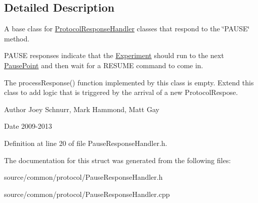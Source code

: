 \subsection{Detailed Description}
A base class for \hyperlink{struct_picto_1_1_protocol_response_handler}{Protocol\-Response\-Handler} classes that respond to the \char`\"{}\-P\-A\-U\-S\-E\char`\"{} method. 

P\-A\-U\-S\-E responses indicate that the \hyperlink{class_picto_1_1_experiment}{Experiment} should run to the next \hyperlink{class_picto_1_1_pause_point}{Pause\-Point} and then wait for a R\-E\-S\-U\-M\-E command to come in.

The process\-Response() function implemented by this class is empty. Extend this class to add logic that is triggered by the arrival of a new Protocol\-Respose. \begin{DoxyAuthor}{Author}
Joey Schnurr, Mark Hammond, Matt Gay 
\end{DoxyAuthor}
\begin{DoxyDate}{Date}
2009-\/2013 
\end{DoxyDate}


Definition at line 20 of file Pause\-Response\-Handler.\-h.



The documentation for this struct was generated from the following files\-:\begin{DoxyCompactItemize}
\item 
source/common/protocol/Pause\-Response\-Handler.\-h\item 
source/common/protocol/Pause\-Response\-Handler.\-cpp\end{DoxyCompactItemize}
